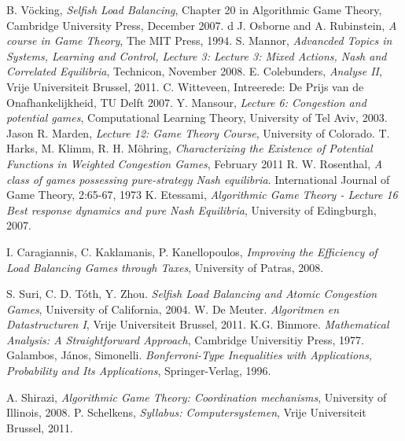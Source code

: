 \documentclass[a4paper,11pt]{article}
\begin{document}
\begin{thebibliography}{99}
 B. V\"{o}cking, \emph{Selfish Load Balancing}, Chapter 20 in Algorithmic Game Theory, Cambridge University Press, December 2007.
 d J. Osborne and A. Rubinstein, \emph{A course in Game Theory},  The MIT Press, 1994.
 S. Mannor, \emph{Advancded Topics in Systems, Learning and Control, Lecture 3: Lecture 3: Mixed Actions, Nash and Correlated Equilibria}, Technicon, November 2008.
 E. Colebunders, \emph{Analyse II}, Vrije Universiteit Brussel, 2011.
 C. Witteveen, Intreerede: De Prijs van de Onafhankelijkheid, TU Delft 2007.
 Y. Mansour, \emph{Lecture 6: Congestion and potential games}, Computational Learning Theory, University of Tel Aviv, 2003.
 Jason R. Marden, \emph{Lecture 12: Game Theory Course}, University of Colorado.
 T. Harks, M. Klimm, R. H. M\"{o}hring, \emph{Characterizing the Existence of Potential Functions in Weighted Congestion Games}, February 2011
 R. W. Rosenthal, \emph{ A class of games possessing pure-strategy Nash equilibria}. International Journal of Game Theory, 2:65-67, 1973
 K. Etessami, \emph{Algorithmic Game Theory - Lecture 16 Best response dynamics and pure Nash Equilibria}, University of Edingburgh, 2007.

 I. Caragiannis, C. Kaklamanis, P. Kanellopoulos, \emph{Improving the Efficiency of Load Balancing Games through Taxes}, University of Patras, 2008.

 S. Suri, C. D. T\'{o}th, Y. Zhou. \emph{Selfish Load Balancing and Atomic Congestion Games}, University of California, 2004.
 W. De Meuter. \emph{Algoritmen en Datastructuren I}, Vrije Universiteit Brussel, 2011.
 K.G. Binmore. \emph{Mathematical Analysis: A Straightforward Approach}, Cambridge Universitiy Press, 1977.
 Galambos, J\'{a}nos, Simonelli. \emph{Bonferroni-Type Inequalities with Applications, Probability and Its Applications}, Springer-Verlag, 1996.

 A. Shirazi, \emph{Algorithmic Game Theory: Coordination mechanisms},
University of Illinois, 2008.
 P. Schelkens, \emph{Syllabus: Computersystemen}, Vrije Universiteit Brussel, 2011.
    \end{thebibliography}
\end{document}
